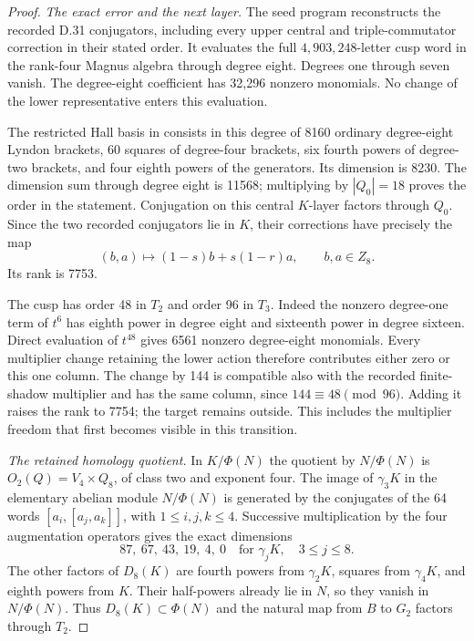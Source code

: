 \begin{proof}
\emph{The exact error and the next layer.}
The seed program reconstructs the recorded D.31
conjugators, including every upper central and
triple-commutator correction in their stated order.
It evaluates the full $4,903,248$-letter cusp word
in the rank-four Magnus algebra through degree
eight. Degrees one through seven vanish. The
degree-eight coefficient has 32,296 nonzero
monomials. No change of the lower representative
enters this evaluation.

The restricted Hall basis in
\cite[Proposition 4.4]{dEfrat2023} consists in this
degree of 8160 ordinary degree-eight Lyndon brackets,
60 squares of degree-four brackets, six fourth
powers of degree-two brackets, and four eighth
powers of the generators. Its dimension is 8230.
The dimension sum through degree eight is 11568;
multiplying by $|Q_0|=18$ proves the order in the
statement. Conjugation on this central $K$-layer
factors through $Q_0$. Since the two recorded
conjugators lie in $K$, their corrections have
precisely the map
\[
 (b,a)\longmapsto(1-s)b+s(1-r)a,\qquad b,a\in Z_8.
                                                            \tag{D.32.3}
\]
Its rank is 7753.

The cusp has order 48 in $T_2$ and order 96 in
$T_3$. Indeed the nonzero degree-one term of $t^6$
has eighth power in degree eight and sixteenth
power in degree sixteen. Direct evaluation of
$t^{48}$ gives 6561 nonzero degree-eight monomials.
Every multiplier change retaining the lower action
therefore contributes either zero or this one
column. The change by 144 is compatible also with
the recorded finite-shadow multiplier and has the
same column, since $144\equiv48\pmod{96}$. Adding
it raises the rank to 7754; the target remains
outside. This includes the multiplier freedom
that first becomes visible in this transition.

\emph{The retained homology quotient.}
In $K/\Phi(N)$ the quotient by $N/\Phi(N)$ is
$O_2(Q)=V_4\times Q_8$, of class two and exponent
four. The image of $\gamma_3K$ in the elementary
abelian module $N/\Phi(N)$ is generated by the
conjugates of the 64 words
$[a_i,[a_j,a_k]]$, with $1\leq i,j,k\leq4$.
Successive multiplication by the four augmentation
operators gives the exact dimensions
\[
 87,\ 67,\ 43,\ 19,\ 4,\ 0
 \quad\text{for }\gamma_jK,\quad3\leq j\leq8.       \tag{D.32.4}
\]
The other factors of $D_8(K)$ are fourth powers
from $\gamma_2K$, squares from $\gamma_4K$, and
eighth powers from $K$. Their half-powers already
lie in $N$, so they vanish in $N/\Phi(N)$. Thus
$D_8(K)\subset\Phi(N)$ and the natural map from
$B$ to $G_2$ factors through $T_2$.


\end{proof}
